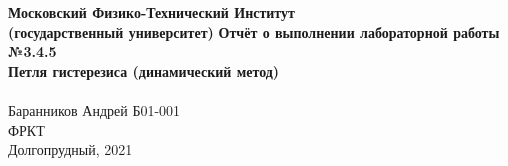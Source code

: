 	\begin{center}
		\large\textbf{Московский Физико-Технический Институт}\\
		\large\textbf{(государственный университет)}
		\vfill
		\huge\textbf{Отчёт о выполнении лабораторной работы №3.4.5\\ Петля гистерезиса (динамический метод)}\\
		\ \\
		\large Баранников Андрей Б01-001\\
		\vfill
		\large ФРКТ\\
		\large Долгопрудный, 2021
	\end{center}

\newpage
\setcounter{page}{2}
\fancyfoot[c]{\thepage}
\fancyhead[R]{}